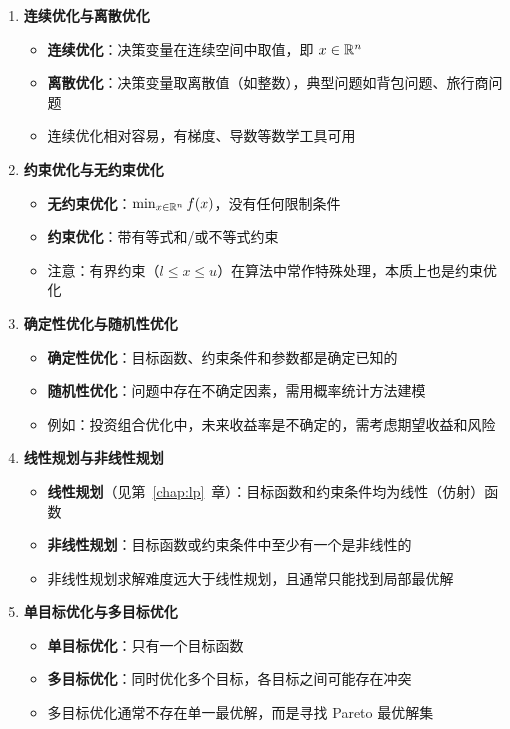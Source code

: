 \begin{conceptbox}[优化问题的分类维度]
\begin{enumerate}[label=(\arabic*), itemsep=0.4em]
    \item \textbf{连续优化与离散优化}
    \begin{itemize}
        \item \textbf{连续优化}：决策变量在连续空间中取值，即 $x \in \mathbb{R}^n$
        \item \textbf{离散优化}：决策变量取离散值（如整数），典型问题如背包问题、旅行商问题
        \item 连续优化相对容易，有梯度、导数等数学工具可用
    \end{itemize}

    \item \textbf{约束优化与无约束优化}
    \begin{itemize}
        \item \textbf{无约束优化}：$\min_{x \in \mathbb{R}^n} f(x)$，没有任何限制条件
        \item \textbf{约束优化}：带有等式和/或不等式约束
        \item 注意：有界约束（$l \leq x \leq u$）在算法中常作特殊处理，本质上也是约束优化
    \end{itemize}

    \item \textbf{确定性优化与随机性优化}
    \begin{itemize}
        \item \textbf{确定性优化}：目标函数、约束条件和参数都是确定已知的
        \item \textbf{随机性优化}：问题中存在不确定因素，需用概率统计方法建模
        \item 例如：投资组合优化中，未来收益率是不确定的，需考虑期望收益和风险
    \end{itemize}

    \item \textbf{线性规划与非线性规划}
    \begin{itemize}
        \item \textbf{线性规划}（见第~\ref{chap:lp}~章）：目标函数和约束条件均为线性（仿射）函数
        \item \textbf{非线性规划}：目标函数或约束条件中至少有一个是非线性的
        \item 非线性规划求解难度远大于线性规划，且通常只能找到局部最优解
    \end{itemize}

    \item \textbf{单目标优化与多目标优化}
    \begin{itemize}
        \item \textbf{单目标优化}：只有一个目标函数
        \item \textbf{多目标优化}：同时优化多个目标，各目标之间可能存在冲突
        \item 多目标优化通常不存在单一最优解，而是寻找 Pareto 最优解集
    \end{itemize}


\end{enumerate}
\end{conceptbox}
